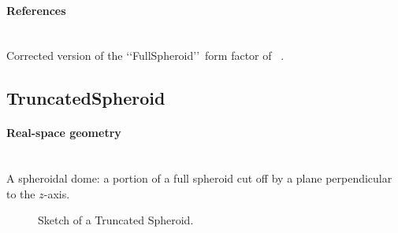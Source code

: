 \paragraph{References}\strut\\
Corrected version of the \lq\lq FullSpheroid\rq\rq\ form factor of \IsGISAXS~\cite{Laz02}.


\newpage
\subsection{TruncatedSpheroid} 

\paragraph{Real-space geometry}\strut\\
A spheroidal dome: a portion of a full spheroid cut off
by a plane perpendicular to the $z$-axis.

\begin{figure}[ht]
\hfill
{}
\hfill
{}
\hfill
\caption{Sketch of a Truncated Spheroid.}
\label{fig:spheroid}
\end{figure}

